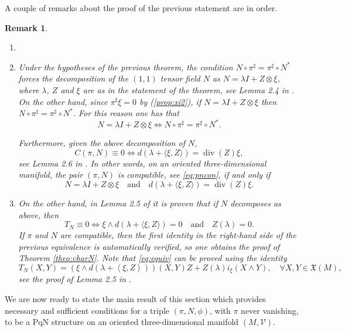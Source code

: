 \documentclass[12pt]{article}
\newtheorem{remark}[theorem]{Remark}
\begin{document}
A couple of remarks about the proof of the previous statement are in order.
\begin{remark}\label{rem:2stat}
\begin{enumerate}
\item[]
\item Under the hypotheses of the previous theorem, the condition $N\circ\pi^\sharp=\pi^\sharp\circ N^\ast$ forces the decomposition of the $(1,1)$ tensor field $N$ as $N=\lambda I+Z\otimes\xi$, where $\lambda$, $Z$ and $\xi$ are as in the statement of the theorem, see Lemma 2.4 in \cite{Cheng-Sheng}. On the other hand, 
since $\pi^\sharp\xi=0$ by (\ref{prop:xi2}), if $N=\lambda I+Z\otimes\xi$ then $N\circ\pi^\sharp=\pi^\sharp\circ N^\ast$. For this reason one has that
\[
N=\lambda I+Z\otimes\xi\iff N\circ\pi^\sharp=\pi^\sharp\circ N^\ast.
\]

Furthermore, given the above decomposition of $N$, 
\[
C(\pi,N)\equiv 0 \iff d(\lambda+\langle\xi,Z\rangle)=\operatorname{div}(Z)\xi,
\] 
see Lemma 2.6 in \cite{Cheng-Sheng}. In other words, on an oriented three-dimensional manifold, the pair $(\pi,N)$ is compatible, see \eqref{eq:pncon}, if and only if
\[
N=\lambda I+Z\otimes\xi\quad\text{and}\quad d(\lambda+\langle\xi,Z\rangle)=\operatorname{div}(Z)\xi.
\]
\item On the other hand, in Lemma 2.5 of \cite{Cheng-Sheng} it is proven that if $N$ decomposes as above, then 
\begin{equation}
T_N\equiv 0\iff 
\xi\wedge d(\lambda+\langle\xi,Z\rangle)= 0\quad\text{and}\quad Z(\lambda) = 0.\label{eq:equiv}
\end{equation}
If $\pi$ and $N$ are compatible, then the first identity in the right-hand side of the previous equivalence is automatically verified, so one obtains the proof of Theorem \ref{theo:charN}. Note that  
\eqref{eq:equiv} can be proved using the identity
\begin{equation}\label{eq: T_N computation} %
T_N(X,Y)=\left(\xi\wedge d\left(\lambda+\left<\xi,Z\right>\right)\right)(X,Y)Z+Z(\lambda)i_{\xi}\left(X\wedge Y\right),
\quad\forall X,Y\in\mathfrak X(M),
\end{equation}
see the proof of Lemma 2.5 in \cite{Cheng-Sheng}.
\end{enumerate}
\end{remark}

We are now ready to state the main result of this section which provides %
necessary and sufficient conditions for a triple $(\pi,N,\phi)$, with $\pi$ never vanishing, to be a PqN structure on an oriented three-dimensional manifold $(M,\mathcal V)$.
\end{document}
